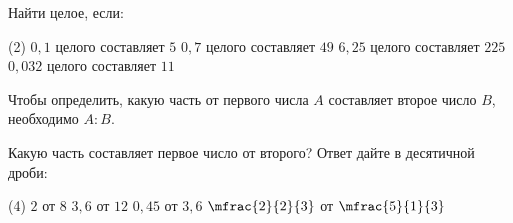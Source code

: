 \begin{class}[number=1]
\begin{definit}
	\end{definit}
	\begin{listofex}[resume]
		\item Найти целое, если:
		\begin{tasks}(2)
			\task \( 0,1 \) целого составляет \( 5 \)
			\task \( 0,7 \) целого составляет \( 49 \)
			\task \( 6,25 \) целого составляет \( 225 \)
			\task \( 0,032 \) целого составляет \( 11 \)
		\end{tasks}
	\end{listofex}
	\begin{definit}
		Чтобы определить, какую часть от первого числа \( A \) составляет второе число \( B \), необходимо \( A:B \).
	\end{definit}
	\begin{listofex}[resume]
		\item Какую часть составляет первое число от второго? Ответ дайте в десятичной дроби:
		\begin{tasks}(4)
			\task \( 2 \) от \( 8 \)
			\task \( 3,6 \) от \( 12 \)
			\task \( 0,45 \) от \( 3,6 \)
			\task \( \mfrac{2}{2}{3} \) от \( \mfrac{5}{1}{3} \)
		\end{tasks}
	\end{listofex}
\end{class}
%
%
